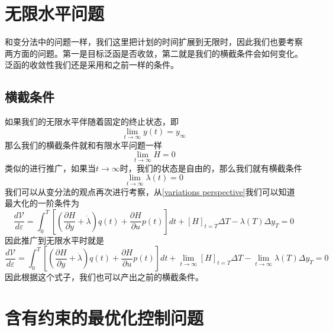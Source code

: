 \documentclass[UTF8,12pt]{ctexart}
\numberwithin{equation}{section} %
\numberwithin{figure}{section}
\numberwithin{table}{section}
\begin{document}
	\newpage
	
	\section{无限水平问题}
	和变分法中的问题一样，我们这里把计划的时间扩展到无限时，因此我们也要考察两方面的问题。第一是目标泛函是否收敛，第二就是我们的横截条件会如何变化。泛函的收敛性我们还是采用和之前一样的条件。
	
	\subsection{横截条件}
	如果我们的无限水平伴随着固定的终止状态，即
	\begin{equation}
		\lim\limits_{t \to \infty}y(t) = y_{\infty}
	\end{equation}
	那么我们的横截条件就和有限水平问题一样
	\begin{equation}
		\lim\limits_{t \to \infty}H = 0
	\end{equation}
	类似的进行推广，如果当$t \to \infty$时，我们的状态是自由的，那么我们就有横截条件
	\begin{equation}
		\lim\limits_{t \to \infty}\lambda(t) = 0
	\end{equation}
	我们可以从变分法的观点再次进行考察，从\ref{variations perspective}我们可以知道最大化的一阶条件为
	\begin{equation}
		\frac{d\mathscr{V}}{d\varepsilon}=\int_{0}^{T}[(\frac{\partial H}{\partial y} + \dot{\lambda})q(t) + \frac{\partial H}{\partial u}p(t)]dt
		+ [H]_{t = T}\Delta T 
		- \lambda(T)\Delta y_T = 0
	\end{equation}
	因此推广到无限水平时就是
	\begin{equation}
		\frac{d\mathscr{V}}{d\varepsilon}=\int_{0}^{T}[(\frac{\partial H}{\partial y} + \dot{\lambda})q(t) + \frac{\partial H}{\partial u}p(t)]dt
		+ \lim\limits_{t \to \infty}[H]_{t = T}\Delta T 
		- \lim\limits_{t \to \infty}\lambda(T)\Delta y_T = 0
	\end{equation}
	因此根据这个式子，我们也可以产出之前的横截条件。
	
 	\newpage
	
	\section{含有约束的最优化控制问题}
	
	
\end{document}
